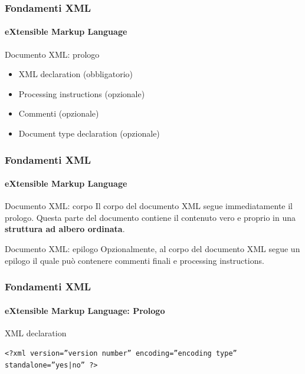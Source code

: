 \begin{frame}
	\frametitle{Fondamenti XML}
	\framesubtitle{eXtensible Markup Language}
	\addtocounter{nframe}{1}

	\begin{block}{Documento XML: prologo}
		\begin{itemize}
			\item XML declaration (obbligatorio)
			\item Processing instructions (opzionale)
			\item Commenti (opzionale)
			\item Document type declaration (opzionale)
		\end{itemize}
        
	\end{block}

\end{frame}

\begin{frame}
	\frametitle{Fondamenti XML}
	\framesubtitle{eXtensible Markup Language}
	\addtocounter{nframe}{1}

	\begin{block}{Documento XML: corpo}
		Il corpo del documento XML segue immediatamente il prologo. Questa parte del documento contiene il contenuto vero e proprio in una \textbf{struttura ad albero ordinata}.
	\end{block}

	\begin{block}{Documento XML: epilogo}
		Opzionalmente, al corpo del documento XML segue un epilogo il quale può contenere commenti finali e processing instructions.
	\end{block}
	

\end{frame}

\begin{frame}
	\frametitle{Fondamenti XML}
	\framesubtitle{eXtensible Markup Language: Prologo}
	\addtocounter{nframe}{1}

	\begin{block}{XML declaration}
    \begin{center}\texttt{<?xml version=”version number” encoding=”encoding type” standalone=”yes|no” ?>}\end{center}
	\end{block}

\end{frame}

